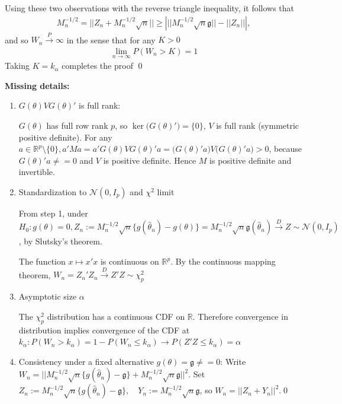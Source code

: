 \documentclass[10pt]{article}
\begin{document}
Using these two observations with the reverse triangle inequality, it follows that 
\begin{gather*}
    M_n^{-1 / 2} = ||Z_n + M_n^{-1 / 2}\sqrt{n}|| \ge \left|||M_n^{-1 / 2}\sqrt{n}\mathfrak{g}|| - ||Z_n||\right|,
\end{gather*}
and so $W_n\xrightarrow{P}\infty $ in the sense that for any $K > 0 $
\begin{gather*}
    \lim_{n \to\infty}P(W_n > K) = 1
\end{gather*}
Taking $K = k_\alpha $ completes the proof \qed

\textbf{Missing details:}

\begin{enumerate}
    \item $G(\theta)VG(\theta)'$ is full rank:
    
    $G(\theta)$ has full row rank $p $, so $\ker\big(G(\theta)'\big) = \{0\}$, $V $ is full rank (symmetric positive definite). For any $a \in \mathbb{R}^p \setminus \{0\}, a'Ma = a'G(\theta)VG(\theta)'a = \big(G(\theta)'a\big)V\big(G(\theta)'a\big) > 0$, because $G(\theta)'a \neq = 0 $ and $V $ is positive definite. Hence $M $ is positive definite and invertible.
    \item Standardization to $\mathcal{N}(0, I_p)$ and $\chi^2 $ limit
    
    From step 1, under $H_0 : g(\theta) = 0, Z_n := M_n^{-1 / 2}\sqrt{n}\{g(\hat{\theta}_n) - g(\theta)\} = M_n^{-1 / 2}\sqrt{n}\mathfrak{g}(\hat{\theta}_n) \xrightarrow{D}Z\sim \mathcal{N}(0, I_p)$, by Slutsky's theorem.

    The function $x \mapsto x'x $ is continuous on $\mathbb{R}^p $. By the continuous mapping theorem, $W_n = Z_n'Z_n\xrightarrow{D} Z'Z\sim \chi_p^2 $
    \item Asymptotic size $\alpha $
    
    The $\chi_p^2 $ distribution has a continuous CDF on $\mathbb{R}$. Therefore convergence in distribution implies convergence of the CDF at $k_\alpha : P(W_n > k_\alpha) = 1 - P(W_n \le k_\alpha) \to P(Z'Z \le k_\alpha) = \alpha $
    \item Consistency under a fixed alternative $g(\theta) = \mathfrak{g} \neq = 0 $: Write $W_n = ||M_n^{-1 / 2}\sqrt{n}\{g(\hat{\theta}_n) - \mathfrak{g}\} + M_n^{-1 / 2}\sqrt{n}\mathfrak{g}||^2 $. Set $Z_n := M_n^{-1 / 2}\sqrt{n}\{g(\hat{\theta}_n) - \mathfrak{g}\},\quad Y_n := M_n^{-1 / 2}\sqrt{n}\mathfrak{g}$, so $W_n = ||Z_n + Y_n||^2 $.\qed
\end{enumerate}
\end{document}
